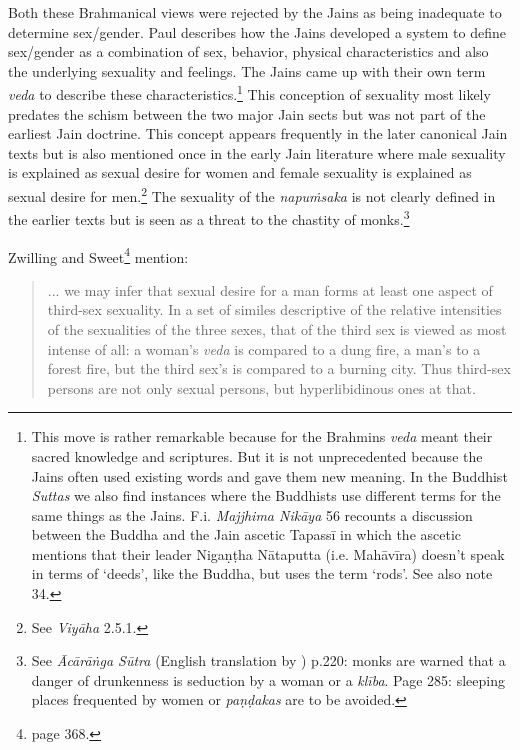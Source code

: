 Both these Brahmanical views were rejected by the Jains as being inadequate to determine sex/gender. Paul \cite{dundas} describes how the Jains developed a system to define sex/gender as a combination of sex, behavior, physical characteristics and also the underlying sexuality and feelings. The Jains came up with their own term \textit{veda} to describe these characteristics.\footnote{This move is rather remarkable because for the Brahmins \textit{veda} meant their sacred knowledge and scriptures. But it is not unprecedented because the Jains often used existing words and gave them new meaning. In the Buddhist \textit{Suttas} we also find instances where the Buddhists use different terms for the same things as the Jains. F.i. \textit{Majjhima Nikāya} 56 recounts a discussion between the Buddha and the Jain ascetic Tapassī in which the ascetic mentions that their leader Nigaṇṭha Nātaputta (i.e. Mahāvīra) doesn't speak in terms of ‘deeds', like the Buddha, but uses the term ‘rods'. See also \cite{zwilling} note 34.} This conception of sexuality most likely predates the schism between the two major Jain sects but was not part of the earliest Jain doctrine. This concept appears frequently in the later canonical Jain texts but is also mentioned once in the early Jain literature where male sexuality is explained as sexual desire for women and female sexuality is explained as sexual desire for men.\footnote{See \textit{Viyāha} 2.5.1.} The sexuality of the \textit{napuṁsaka} is not clearly defined in the earlier texts but is seen as a threat to the chastity of monks.\footnote{See \textit{Ācārāṅga Sūtra} (English translation by \cite{jacobi}) p.220: monks are warned that a danger of drunkenness is seduction by a woman or a \textit{klība}. Page 285: sleeping places frequented by women or \textit{paṇḍakas} are to be avoided.}

Zwilling and Sweet\footnote{\cite{zwilling} page 368.} mention:

\begin{quote}
... we may infer that sexual desire for a man forms at least one aspect of third-sex sexuality. In a set of similes descriptive of the relative intensities of the sexualities of the three sexes, that of the third sex is viewed as most intense of all: a woman's \textit{veda} is compared to a dung fire, a man's to a forest fire, but the third sex's is compared to a burning city. Thus third-sex persons are not only sexual persons, but hyperlibidinous ones at that.
\end{quote}

